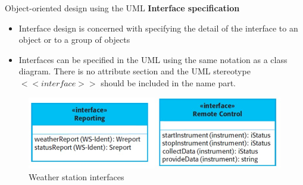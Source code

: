 \documentclass{beamer}
\begin{document}
\begin{frame}{Object-oriented design using the UML}
		\textbf{Interface specification}
		\begin{itemize}
			\item Interface design is concerned with specifying the detail of the interface to an object or to a group of objects
			\item Interfaces can be specified in the UML using the same notation as a class diagram. There 	is no attribute section and the UML stereotype $<<interface>>$ should be included in the 
			name part.
		\end{itemize}
		\begin{figure}
		\includegraphics[scale=.5]{img/m3_9}
		\caption{Weather station interfaces
		}
	\end{figure}
\end{frame}
\end{document}
